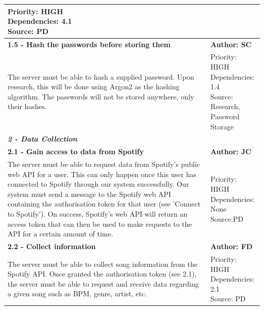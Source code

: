 \documentclass[10pt, notitlepage]{report}
\begin{document}
\begin{center}
\begin{longtable}{| p{13cm} | p{3cm} |}
\makecell{Priority: HIGH\\Dependencies: 4.1\\Source: PD}\\
\hline
\textbf{1.5 - Hash the passwords before storing them} & \textbf{Author: SC} \\
\hline
The server must be able to hash a supplied password. Upon research, this will be done using Argon2 as the hashing algorithm. The passwords will not be stored anywhere, only their hashes.&
\makecell{Priority: HIGH\\Dependencies: 1.4\\Source: Research,\\Password Storage}\\
\hline

\multicolumn{2}{|l|}{\textbf{\textit{2 - Data Collection}}} \\
\hline
\textbf{2.1 - Gain access to data from Spotify} & \textbf{Author: JC} \\
\hline
The server must be able to request data from Spotify’s public web API for a user. This can only happen once this user has connected to Spotify through our system successfully.
Our system must send a message to the Spotify web API containing the authorisation token for that user (see 'Connect to Spotify'). On success, Spotify's web API will return an access token that can then be used to make requests to the API for a certain amount of time.& 
\makecell{Priority: HIGH \\ Dependencies: None\\Source:PD} \\
\hline
\textbf{2.2 - Collect information} & \textbf{Author: FD} \\
\hline
The server must be able to collect song information from the Spotify API. Once granted the authorisation token (see 2.1), the server must be able to request and receive data regarding a given song such as BPM, genre, artist, etc.&
\makecell{Priority: HIGH\\Dependencies: 2.1\\Source: PD}\\
\hline


\end{longtable}
\end{center}
\end{document}

